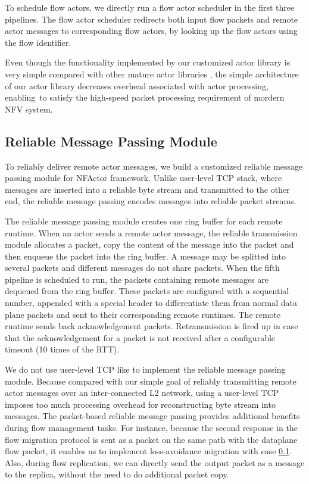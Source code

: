 To schedule flow actors, we directly run a flow actor scheduler in the first three pipelines. The flow actor scheduler redirects both input flow packets and remote actor messages to corresponding flow actors, by looking up the flow actors using the flow identifier.

Even though the functionality implemented by our customized actor library is very simple compared with other mature actor libraries \cite{akka} \cite{caf}, the simple architecture of our actor library decreases overhead associated with actor processing, enabling~\nfactor to satisfy the high-speed packet processing requirement of mordern NFV system. %

\subsection{Reliable Message Passing Module}

To reliably deliver remote actor messages, we build a customized reliable message passing module for NFActor framework. Unlike user-level TCP stack, where messages are inserted into a reliable byte stream and transmitted to the other end, the reliable message passing encodes messages into reliable packet streams.

The reliable message passing module creates one ring buffer for each remote runtime. When an actor sends a remote actor message, the reliable transmission module allocates a packet, copy the content of the message into the packet and then enqueue the packet into the ring buffer. A message may be splitted into several packets and different messages do not share packets. When the fifth pipeline is scheduled to run, the packets containing remote messages are dequeued from the ring buffer. These packets are configured with a sequential number, appended with a special header to differentiate them from normal data plane packets and sent to their corresponding remote runtimes. The remote runtime sends back acknowledgement packets. Retransmission is fired up in case that the acknowledgement for a packet is not received after a configurable timeout (10 times of the RTT).

We do not use user-level TCP like \cite{mtcp} to implement the reliable message passing module. Because compared with our simple goal of reliably transmitting remote actor messages over an inter-connected L2 network, using a user-level TCP imposes too much processing overhead for reconstructing byte stream into messages. The packet-based reliable message passing provides additional benefits during flow management tasks. For instance, because the second response in the flow migration protocol is sent as a packet on the same path with the dataplane flow packet, it enables us to implement loss-avoidance migration with ease \ref{}. Also, during flow replication, we can directly send the output packet as a message to the replica, without the need to do additional packet copy.

